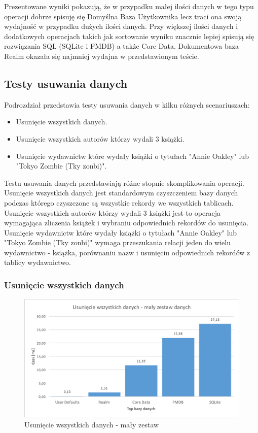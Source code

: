 Prezentowane wyniki pokazują, że w przypadku małej ilości danych w tego typu operacji dobrze spisuję się Domyślna Baza Użytkownika lecz traci ona swoją wydajność w przypadku dużych ilości danych. Przy większej ilości danych i dodatkowych operacjach takich jak sortowanie wyniku znacznie lepiej spisują się rozwiązania SQL (SQLite i FMDB) a także Core Data. Dokumentowa baza Realm okazała się najmniej wydajna w przedstawionym teście. 

\subsection{Testy usuwania danych}

Podrozdział przedstawia testy usuwania danych w kilku różnych scenariuszach: 

\begin{itemize}
\item Usunięcie wszystkich danych.
\item Usunięcie wszystkich autorów którzy wydali 3 książki.
\item Usunięcie wydawnictw które wydały książki o tytułach "Annie Oakley" lub "Tokyo Zombie (Tky zonbi)".
\end{itemize}

Testu usuwania danych przedstawiają różne stopnie skomplikowania operacji. Usunięcie wszystkich danych jest standardowym czyszczeniem bazy danych podczas którego czyszczone są wszystkie rekordy we wszystkich tablicach. Usunięcie wszystkich autorów którzy wydali 3 książki jest to operacja wymagająca zliczenia książek i wybraniu odpowiednich rekordów do usunięcia. Usunięcie wydawnictw które wydały książki o tytułach "Annie Oakley" lub "Tokyo Zombie (Tky zonbi)" wymaga przeszukania relacji jeden do wielu wydawnictwo - książka, porównaniu nazw i usunięciu odpowiednich rekordów z tablicy wydawnictwo. 

\subsubsection{Usunięcie wszystkich danych}

\begin{figure}[H]
\centering
	\includegraphics[width=15cm]{img/delete_data/delete_all/delete_all_small_test.png}
	\caption{Usunięcie wszystkich danych - mały zestaw}
	\label{fig: delete-all-small}
\end{figure}

